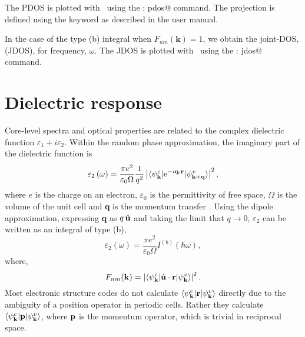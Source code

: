 \documentclass[a4paper,11pt,twoside]{book}
\newcommand{\kbf}{\mathbf{k}}
\newcommand{\e}{\mathrm{e}}
\begin{document}
The PDOS is plotted with \optados\ using the \verb@task : pdos@
command.
%
The projection is defined using the \verb@pdos@ keyword as described
in the user manual.

In the case of the type (b) integral when $F_{nm}(\kbf)=1$, we
obtain the joint-DOS, (JDOS), for frequency, $\omega$.
%
The JDOS is plotted with \optados\ using the \verb@task : jdos@ command.



\section{Dielectric response}

Core-level spectra and optical properties are related to the complex dielectric function $\varepsilon_1+i\varepsilon_2$.  Within the random phase approximation, the imaginary part of the dielectric function is
\begin{equation}
\varepsilon_2 \left ( \omega \right ) = \frac{\pi e^2}{\varepsilon_0 \Omega} \frac{1}{q^2} \left | \langle  \psi^c_{\bf k}   |  \e^{-i{\bf q}.{\bf r}} | \psi^v_{\bf k + q} \rangle\right |^2,
\end{equation}
where $e$ is the charge on an electron, $\varepsilon_0$ is the permittivity of free space, $\Omega$ is the volume of the unit cell and {\bf q} is the momentum transfer \cite{dressel}.
Using the dipole approximation, expressing {\bf q} as $q\,\hat{\bf{u}}$ and taking the limit that $q \rightarrow 0$, $\varepsilon_2$ can be written as an integral of type (b),
\begin{equation}
\varepsilon_2 \left ( \omega \right ) = \frac{\pi e^2}{\varepsilon_0 \Omega} I^{(b)}\left ( \hbar \omega \right ),
\label{Eqn:Epsilon2}
\end{equation}
where,
\begin{equation}
F_{nm}(\kbf)= \left | \langle \psi^c_{\bf k}  |  \hat{\bf u}\cdot {\bf r} | \psi^v_{\bf k} \rangle\right |^2.
\label{Eqn:Dipole}
\end{equation}
Most electronic structure codes do not calculate $\langle \psi^c_{\bf k}  |  {\bf r} | \psi^v_{\bf k} \rangle$ directly due to the ambiguity of a position operator in periodic cells.
%
Rather they calculate $\langle \psi^c_{\bf k}  |  {\bf p} | \psi^v_{\bf k} \rangle$, where ${\bf p}$ is the momentum operator, which is trivial in reciprocal space.
\end{document}
